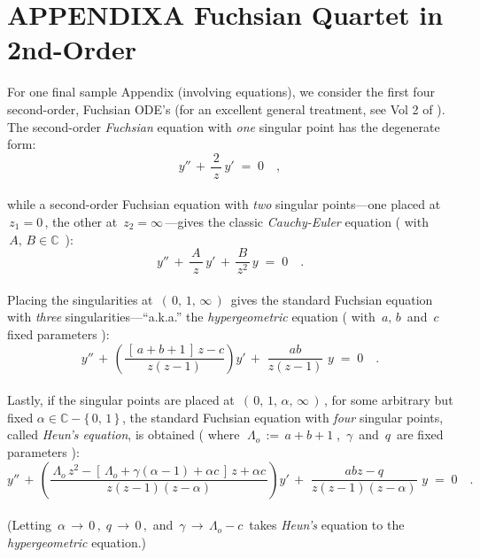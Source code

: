 \documentclass[11pt]{gthesis2}  %
\newcommand{\cone}{\ensuremath{\mathbb{C}}}
\begin{document}
\section{APPENDIX\;\;\;A Fuchsian Quartet in 2nd-Order}
\label{sec:Fuchs}
%
%
\indent For one final sample Appendix (involving equations), we
consider the first four second-order, Fuchsian ODE's (for an
excellent general treatment, see Vol 2 of \cite{GS60}). The
second-order \emph{Fuchsian} equation with \emph{one} singular
point has the degenerate form:
%
\begin{equation}\label{eq:fuchs1}
%
y''\,+\,\frac{\,2\,}{z}\,y' \;=\;0\quad,
%
\end{equation}
%
\\
while a second-order Fuchsian equation with \emph{two} singular
points---one placed at $\,z_{1}=0\,$, the other at
$\,z_{2}=\infty\,$---gives the classic \emph{Cauchy-Euler}
equation ( with $\,A,\,B\in\cone\,$ ):
\\
%
\begin{equation}\label{eq:fuchs2}
%
y''\,+\,\frac{\,A\,}{z}\,y'\,+\,\frac{\,B\,}{z^{2}}\,y\;=\;0\quad.
%
\end{equation}
%
\\
Placing the singularities at $\,(\,0,\,1,\,\infty\,)\,$ gives the
standard Fuchsian equation with \emph{three}
singularities---``a.k.a.'' the \emph{hypergeometric} equation (
with $\,a,\,b\,$ and $\,c\,$ fixed parameters ):
\\
%
\begin{equation}\label{eq:fuchs3}
%
y''\,+\,\left(\frac{\,[\,a + b + 1\,]\,z - c}{z(z -1)}\right)y'
\,+\, \,\frac{ab}{z(z - 1)}\,\,y \;=\;0\quad.
%
\end{equation}
%
\\
Lastly, if the singular points are placed at
$\,(\,0,\,1,\,\alpha,\,\infty\,)\,$, for some arbitrary but fixed
$\alpha\in\cone-\{\,0,\,1\,\}\,$, the standard Fuchsian equation
with \emph{four} singular points, called \emph{Heun's equation},
is obtained ( where $\;\Lambda_{o} \,:=\, a + b + 1\;$,
$\,\gamma\,$ and $\,q\,$ are fixed parameters ):
\\
%
\begin{equation}\label{eq:fuchs4}
%
y''\,+\,\left(\frac{\,\Lambda_{o}\,z^{2} - [\,\Lambda_{o} +
\gamma(\alpha -1) + \alpha c\,]\,z + \alpha c\,}{z(z
-1)(z-\alpha)}\right)y' \,+\,\,\frac{\,abz - q\,}{z(z
-1)(z-\alpha)}\,\,y \;=\;0\quad.
%
\end{equation}
%
\\
(Letting
$\,\alpha\,\longrightarrow\,0\,,\;q\,\longrightarrow\,0\,,$ and
$\,\gamma\,\longrightarrow\,\Lambda_{o} - c\,$ takes \emph{Heun's}
equation to the \emph{hypergeometric} equation.)
%
\newpage%
%
\end{document}

